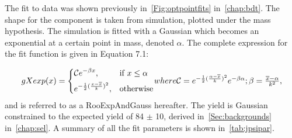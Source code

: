 


The fit to \Lbpijpsi data was shown previously in~\autoref{Fig:optpointfits} in~\autoref{chap:bdt}. The shape for the \LbKjpsi component is taken from \LbKjpsi simulation, plotted under the \Lbpijpsi mass hypothesis. The \LbKjpsi simulation is fitted with a Gaussian which becomes an exponential at a certain point in mass, denoted $\alpha$. The complete expression for the fit function is given in Equation 7.1:

\begin{equation}
  \label{Eq:gexp2}
  gXexp(x)=
  \begin{dcases}
   \mathcal{C} e^{-\beta x},& \text{if } x\leq \alpha\\
    e^{-\frac{1}{2}(\frac{x-\overline{x}}{k})^{2}}, & \text{otherwise}
  \end{dcases}
  $$where$$
  \mathcal{C} = e^{-\frac{1}{2}(\frac{\alpha-\overline{x}}{k})^{2}}e^{-\beta \alpha};  \beta = \frac{\overline{x} - \alpha}{k^{2}},
  \end{equation}
and is referred to as a RooExpAndGauss hereafter.
The \LbKjpsi yield is Gaussian constrained to the expected yield of 84 $\pm$ 10, derived in~\autoref{Sec:backgrounds} in~\autoref{chap:sel}. A summary of all the \Lbpijpsi fit parameters is shown in~\autoref{tab:jpsipar}.





